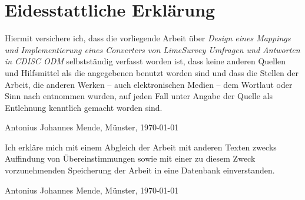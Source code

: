 \chapter*{Eidesstattliche Erklärung}


Hiermit versichere ich, dass die vorliegende Arbeit über \textit{\glqq Design eines Mappings und Implementierung eines Converters von LimeSurvey Umfragen und Antworten in CDISC ODM\grqq} selbstständig verfasst worden ist, dass keine anderen Quellen und Hilfsmittel als die angegebenen benutzt worden sind und dass die Stellen der Arbeit, die anderen Werken – auch elektronischen Medien – dem Wortlaut oder Sinn nach entnommen wurden, auf jeden Fall unter Angabe der Quelle als Entlehnung kenntlich gemacht worden sind.

\vspace{1cm}

\parbox{20em}{\hrulefill}

Antonius Johannes Mende, Münster, \today

\vspace{1cm}

Ich erkläre mich mit einem Abgleich der Arbeit mit anderen Texten zwecks Auffindung von Übereinstimmungen sowie mit einer zu diesem Zweck vorzunehmenden Speicherung der Arbeit in eine Datenbank einverstanden.

\vspace{1cm}

\parbox{20em}{\hrulefill}

Antonius Johannes Mende, Münster, \today
